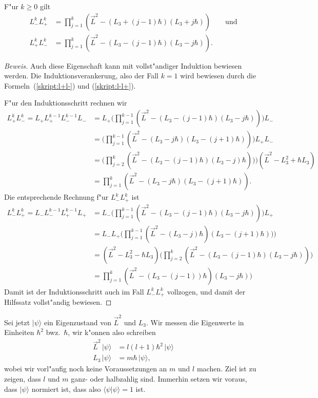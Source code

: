 \begin{hilfssatz}
F"ur $k\ge 0$ gilt 
\begin{align*}
L_-^kL_+^k
&=
\prod_{j=1}^k (\vec L^2 - (L_3+(j-1)\hbar)(L_3+j\hbar))\qquad\text{und}
\\
L_+^kL_-^k
&=
\prod_{j=1}^k (\vec L^2 - (L_3-(j-1)\hbar)(L_3-j\hbar)).
\end{align*}
\end{hilfssatz}

\begin{proof}[Beweis]
Auch diese Eigenschaft kann mit vollst"andiger Induktion bewiesen
werden.
Die Induktionsverankerung, also der Fall $k=1$ wird bewiesen durch
die Formeln~(\ref{skript:l+l-}) und (\ref{skript:l-l+}).

F"ur den Induktionsschritt rechnen wir
\begin{align*}
L_+^kL_-^k
=
L_+ L_+^{k-1}L_-^{k-1}L_-
&=
L_+\biggl(
\prod_{j=1}^{k-1} (\vec L^2 - (L_3-(j-1)\hbar)(L_3-j\hbar))
\biggr)L_-
\\
&=
\biggl(
\prod_{j=1}^{k-1} (\vec L^2 - (L_3-j\hbar)(L_3-(j+1)\hbar))
\biggr)L_+L_-
\\
&=
\biggl(
\prod_{j=2}^{k} (\vec L^2 - (L_3-(j-1)\hbar)(L_3-j)\hbar))
\biggr)
(\vec L^2 -L_3^2+\hbar L_3)
\\
&=
\prod_{j=1}^{k} (\vec L^2 - (L_3-j\hbar)(L_3-(j+1)\hbar)).
\end{align*}
Die entsprechende Rechnung f"ur $L_-^kL_+^k$ ist
\begin{align*}
L_-^kL_+^k
=
L_-L_-^{k-1}L_+^{k-1}L_+
&=
L_-\biggl(
\prod_{j=1}^{k-1}
(\vec L^2-(L_3-(j-1)\hbar)(L_3-j\hbar))
\biggr)L_+
\\
&=
L_-L_+\biggl(
\prod_{j=1}^{k-1}
(\vec L^2-(L_3-j)\hbar)(L_3-(j+1)\hbar))
\biggr)
\\
&=
(\vec L^2-L_3^2-\hbar L_3)\biggl(
\prod_{j=2}^k
(\vec L^2-(L_3-(j-1)\hbar)(L_3-j\hbar))
\biggr)
\\
&=
\prod_{j=1}^k
(\vec L^2-(L_3-(j-1))\hbar)(L_3-j\hbar))
\end{align*}
Damit ist der Induktionsschritt auch im Fall $L_-^kL_+^k$ vollzogen, und
damit der Hilfssatz vollst"andig bewiesen.
\end{proof}

Sei jetzt $|\psi\rangle$ ein Eigenzustand von $\vec L^2$ und $L_3$.
Wir messen die Eigenwerte in Einheiten $\hbar^2$ bwz.~$\hbar$, wir
k"onnen also schreiben
\begin{align*}
\vec L^2\, |\psi\rangle &= l(l+1)\hbar^2\,|\psi\rangle \\
     L_3\, |\psi\rangle &= m\hbar\,       |\psi\rangle,
\end{align*}
wobei wir vorl"aufig noch keine Voraussetzungen an $m$ und $l$ machen.
Ziel ist zu zeigen, dass $l$ und $m$ ganz- oder halbzahlig sind.
Immerhin setzen wir voraus, dass $|\psi\rangle$ normiert ist, dass also
$\langle\psi|\psi\rangle=1$ ist.

